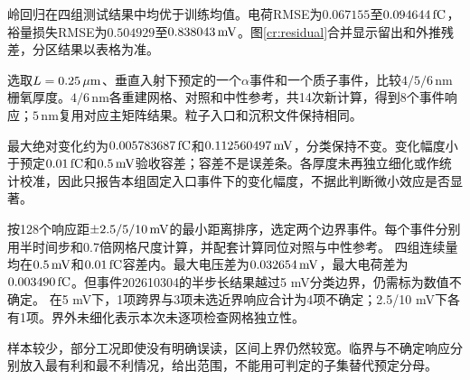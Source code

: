 \documentclass[UTF8,a4paper,zihao=-4,fontset=fandol]{ctexart}
\begin{document}
\begin{table}[H]\centering\small\caption{固定预测的分区误差。每行$n=16$，缺失与无效均为0。}\scoretable\end{table}

岭回归在四组测试结果中均优于训练均值。电荷RMSE为$0.067155$至$0.094644\,\mathrm{fC}$，裕量损失RMSE为$0.504929$至$0.838043\,\mathrm{mV}$。图\ref{cr:residual}合并显示留出和外推残差，分区结果以表格为准。

选取$L=0.25\,\mu\mathrm{m}$、垂直入射下预定的一个$\alpha$事件和一个质子事件，比较$4/5/6\,\mathrm{nm}$栅氧厚度。$4/6\,\mathrm{nm}$各重建网格、对照和中性参考，共14次新计算，得到8个事件响应；$5\,\mathrm{nm}$复用对应主矩阵结果。粒子入口和沉积文件保持相同。

最大绝对变化约为$0.005783687\,\mathrm{fC}$和$0.112560497\,\mathrm{mV}$，分类保持不变。变化幅度小于预定$0.01\,\mathrm{fC}$和$0.5\,\mathrm{mV}$验收容差；容差不是误差条。各厚度未再独立细化或作统计校准，因此只报告本组固定入口事件下的变化幅度，不据此判断微小效应是否显著。

按128个响应距$\pm2.5/5/10\,\mathrm{mV}$的最小距离排序，选定两个边界事件。每个事件分别用半时间步和0.7倍网格尺度计算，并配套计算同位对照与中性参考。
四组连续量均在$0.5\,\mathrm{mV}$和$0.01\,\mathrm{fC}$容差内。最大电压差为$0.032654\,\mathrm{mV}$，最大电荷差为$0.003490\,\mathrm{fC}$。但事件202610304的半步长结果越过5 mV分类边界，仍需标为数值不确定。
在5 mV下，1项跨界与3项未选近界响应合计为4项不确定；2.5/10 mV下各有1项。界外未细化表示本次未逐项检查网格独立性。

样本较少，部分工况即使没有明确误读，区间上界仍然较宽。临界与不确定响应分别放入最有利和最不利情况，给出范围，不能用可判定的子集替代预定分母。
\end{document}
